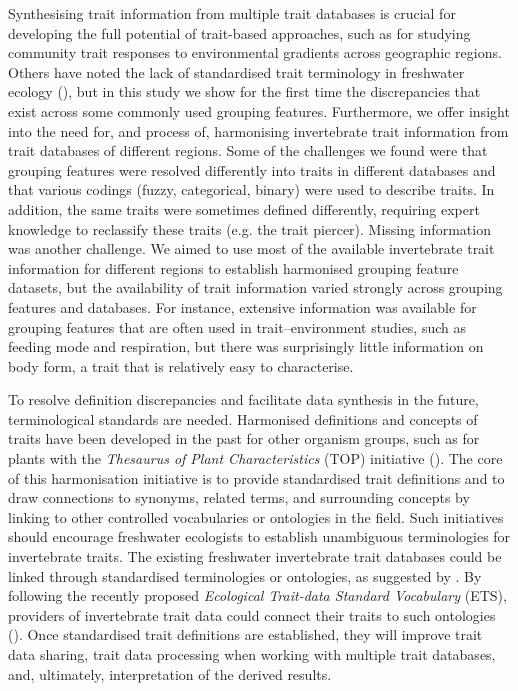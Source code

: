 \documentclass[12pt]{article}
\begin{document}
Synthesising trait information from multiple trait databases is crucial for developing the full potential of trait-based approaches, such as for studying community trait responses to environmental gradients across geographic regions. Others have noted the lack of standardised trait terminology in freshwater ecology (\cite{baird_toward_2011, brink_traits-based_2011}), but in this study we show for the first time the discrepancies that exist across some commonly used grouping features. Furthermore, we offer insight into the need for, and process of, harmonising invertebrate trait information from trait databases of different regions. Some of the challenges we found were that grouping features were resolved differently into traits in different databases and that various codings (fuzzy, categorical, binary) were used to describe traits. In addition, the same traits were sometimes defined differently, requiring expert knowledge to reclassify these traits (e.g. the trait piercer). Missing information was another challenge. We aimed to use most of the available invertebrate trait information for different regions to establish harmonised grouping feature datasets, but the availability of trait information varied strongly across grouping features and databases. For instance, extensive information was available for grouping features that are often used in trait–environment studies, such as feeding mode and respiration, but there was surprisingly little information on body form, a trait that is relatively easy to characterise.

To resolve definition discrepancies and facilitate data synthesis in the future, terminological standards are needed. Harmonised definitions and concepts of traits have been developed in the past for other organism groups, such as for plants with the \textit{Thesaurus of Plant Characteristics} (TOP) initiative (\cite{garnier_towards_2017}). The core of this harmonisation initiative is to provide standardised trait definitions and to draw connections to synonyms, related terms, and surrounding concepts by linking to other controlled vocabularies or ontologies in the field. Such initiatives should encourage freshwater ecologists to establish unambiguous terminologies for invertebrate traits. The existing freshwater invertebrate trait databases could be linked through standardised terminologies or ontologies, as suggested by \citet{baird_toward_2011}. By following the recently proposed \textit{Ecological Trait-data Standard Vocabulary} (ETS), providers of invertebrate trait data could connect their traits to such ontologies (\cite{schneider_towards_2019}). Once standardised trait definitions are established, they will improve trait data sharing, trait data processing when working with multiple trait databases, and, ultimately, interpretation of the derived results. 
\end{document}
